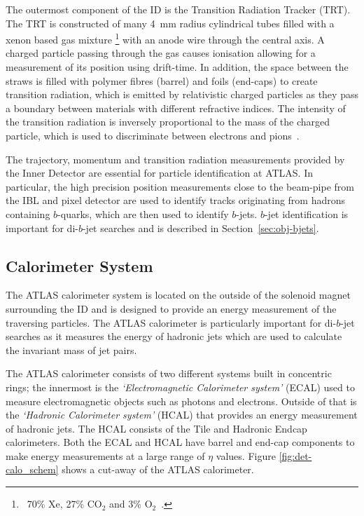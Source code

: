 The outermost component of the ID is the Transition Radiation Tracker (TRT).
The TRT is constructed of many \SI{4}{\mm} radius cylindrical tubes filled with a xenon based gas mixture
\footnote{\ 70\% Xe, 27\% $\text{CO}_2$ and 3\% $\text{O}_2$~\cite{det-ID_xe}.}
with an anode wire through the central axis.
A charged particle passing through the gas causes ionisation allowing for a measurement of its position using drift-time.
In addition, the space between the straws is filled with polymer fibres (barrel) and foils (end-caps) to create transition radiation,
which is emitted by relativistic charged particles as they pass a boundary between materials with different refractive indices.
The intensity of the transition radiation is inversely proportional to the mass of the charged particle,
which is used to discriminate between electrons and pions~\cite{det-ID_TR}.

The trajectory, momentum and transition radiation measurements provided by the Inner Detector are essential for particle identification at ATLAS.
In particular, the high precision position measurements close to the beam-pipe from the IBL and pixel detector
are used to identify tracks originating from hadrons containing $b$-quarks, which are then used to identify $b$-jets.
$b$-jet identification is important for di-$b$-jet searches and is described in Section~\ref{sec:obj-bjets}.

\subsection{Calorimeter System}
\label{sec:det-calo}

The ATLAS calorimeter system is located on the outside of the solenoid magnet surrounding the ID and
is designed to provide an energy measurement of the traversing particles.
The ATLAS calorimeter is particularly important for di-$b$-jet searches as it measures the
energy of hadronic jets which are used to calculate the invariant mass of jet pairs. %

The ATLAS calorimeter consists of two different systems built in concentric rings;
the innermost is the \textit{`Electromagnetic Calorimeter system'} (ECAL) used to measure electromagnetic objects such as photons and electrons.
Outside of that is the \textit{`Hadronic Calorimeter system'} (HCAL) that provides an energy measurement of hadronic jets.
The HCAL consists of the Tile and Hadronic Endcap calorimeters.
Both the ECAL and HCAL have barrel and end-cap components to make energy measurements at a large range of $\eta$ values.
Figure \ref{fig:det-calo_schem} shows a cut-away of the ATLAS calorimeter.

